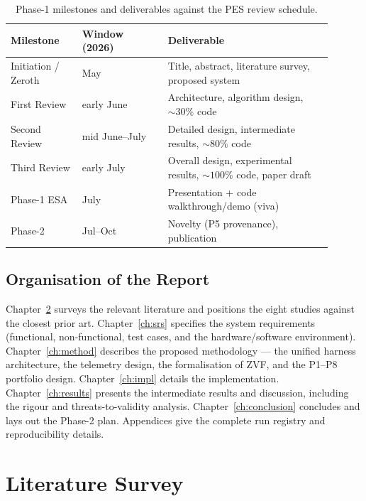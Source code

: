 \documentclass[12pt,a4paper]{report}
\begin{document}
\begin{table}[h]
\centering\small
\begin{tabular}{@{}L{0.20\linewidth}L{0.24\linewidth}L{0.46\linewidth}@{}}
\toprule
\textbf{Milestone} & \textbf{Window (2026)} & \textbf{Deliverable} \\
\midrule
Initiation / Zeroth & May & Title, abstract, literature survey, proposed system \\
First Review & early June & Architecture, algorithm design, ${\sim}30\%$ code \\
Second Review & mid June--July & Detailed design, intermediate results, ${\sim}80\%$ code \\
Third Review & early July & Overall design, experimental results, ${\sim}100\%$ code, paper draft \\
Phase-1 ESA & July & Presentation + code walkthrough/demo (viva) \\
Phase-2 & Jul--Oct & Novelty (P5 provenance), publication \\
\bottomrule
\end{tabular}
\caption{Phase-1 milestones and deliverables against the PES review schedule.}
\label{tab:timeline}
\end{table}

\section{Organisation of the Report}
Chapter~\ref{ch:lit} surveys the relevant literature and positions the eight
studies against the closest prior art. Chapter~\ref{ch:srs} specifies the system
requirements (functional, non-functional, test cases, and the hardware/software
environment). Chapter~\ref{ch:method} describes the proposed methodology --- the
unified harness architecture, the telemetry design, the formalisation of ZVF, and
the P1--P8 portfolio design. Chapter~\ref{ch:impl} details the implementation.
Chapter~\ref{ch:results} presents the intermediate results and discussion,
including the rigour and threats-to-validity analysis. Chapter~\ref{ch:conclusion}
concludes and lays out the Phase-2 plan. Appendices give the complete run registry
and reproducibility details.

\chapter{Literature Survey}
\label{ch:lit}
\end{document}
